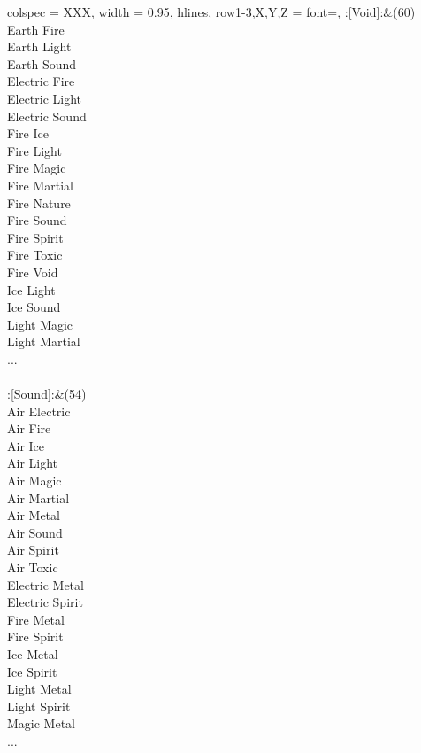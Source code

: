 \begin{longtblr}[
	caption = {1v2 Attacking Effective},
	label = {1v2-Attacking-Effective},
]{
	colspec = {XXX}, width = 0.95\linewidth,
	hlines,
	row{1-3,X,Y,Z} = {font=\bfseries},
}
	:[Void]:&{(60)\\
	Earth Fire \\
	Earth Light \\
	Earth Sound \\
	Electric Fire \\
	Electric Light \\
	Electric Sound \\
	Fire Ice \\
	Fire Light \\
	Fire Magic \\
	Fire Martial \\
	Fire Nature \\
	Fire Sound \\
	Fire Spirit \\
	Fire Toxic \\
	Fire Void \\
	Ice Light \\
	Ice Sound \\
	Light Magic \\
	Light Martial \\
	...\\
	}\\

	:[Sound]:&{(54)\\
	Air Electric \\
	Air Fire \\
	Air Ice \\
	Air Light \\
	Air Magic \\
	Air Martial \\
	Air Metal \\
	Air Sound \\
	Air Spirit \\
	Air Toxic \\
	Electric Metal \\
	Electric Spirit \\
	Fire Metal \\
	Fire Spirit \\
	Ice Metal \\
	Ice Spirit \\
	Light Metal \\
	Light Spirit \\
	Magic Metal \\
	...\\
	}\\


\end{longtblr}
